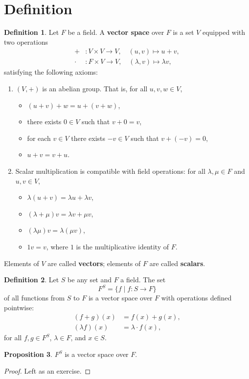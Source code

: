 \documentclass{book}
\theoremstyle{definition}
\newtheorem{definition}{Definition}[section]
\newtheorem{proposition}[definition]{Proposition}
\begin{document}
\section{Definition}

\begin{definition}
Let $F$ be a field. A \textbf{vector space} over $F$ is a set $V$ equipped with two operations
\[
\begin{aligned}
+       &\colon V \times V \to V, \quad (u, v) \mapsto u + v, \\
\cdot   &\colon F \times V \to V, \quad (\lambda, v) \mapsto \lambda v,
\end{aligned}
\]
satisfying the following axioms:

\begin{enumerate}
\item
    $(V, +)$ is an abelian group. That is, for all $u, v, w \in V$,
    \begin{itemize}
        \item $(u + v) + w = u + (v + w)$,
        \item there exists $0 \in V$ such that $v + 0 = v$,
        \item for each $v \in V$ there exists $-v \in V$ such that $v + (-v) = 0$,
        \item $u + v = v + u$.
    \end{itemize}
\item
    Scalar multiplication is compatible with field operations: for all $\lambda, \mu \in F$ and $u, v \in V$,
    \begin{itemize}
        \item $\lambda(u + v) = \lambda u + \lambda v$,
        \item $(\lambda + \mu)v = \lambda v + \mu v$,
        \item $(\lambda\mu)v = \lambda(\mu v)$,
        \item $1v = v$, where $1$ is the multiplicative identity of $F$.
    \end{itemize}
\end{enumerate}

Elements of $V$ are called \textbf{vectors}; elements of $F$ are called \textbf{scalars}.
\end{definition}

\begin{definition}
Let $S$ be any set and $F$ a field. The set
\[
F^{S} = \{ f \mid f \colon S \to F \}
\]
of all functions from $S$ to $F$ is a vector space over $F$ with operations defined pointwise:
\[
\begin{aligned}
(f + g)(x) &= f(x) + g(x), \\
(\lambda f)(x) &= \lambda \cdot f(x),
\end{aligned}
\]
for all $f, g \in F^{S}$, $\lambda \in F$, and $x \in S$.
\end{definition}

\begin{proposition}
$F^{S}$ is a vector space over $F$.
\end{proposition}

\begin{proof}
Left as an exercise.
\end{proof}
\end{document}
